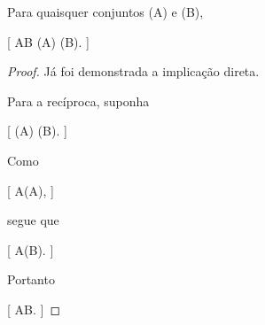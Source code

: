 \documentclass[../../main]{subfiles}
\begin{document}
\begin{prop}
	\label{prop:matematica:teoria-conjuntos:conjunto-das-partes:inclusao}

	Para quaisquer conjuntos (A) e (B),

	[
			A\subseteq B
			\Leftrightarrow
			(A)
			\subseteq
			(B).
		]

\end{prop}

\begin{proof}

	Já foi demonstrada a implicação direta.

	Para a recíproca, suponha

		[
			(A)
			\subseteq
			(B).
		]

	Como

		[
			A\in{}(A),
		]

	segue que

		[
			A\in{}(B).
		]

	Portanto

		[
			A\subseteq B.
		]

\end{proof}
\end{document}
